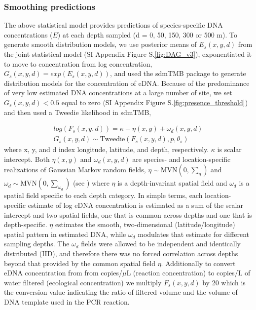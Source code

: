 \documentclass{article}
\begin{document}
\subsubsection*{Smoothing predictions}

The above statistical model provides predictions of species-specific DNA concentrations ($E$) at each depth sampled (d = 0, 50, 150, 300 or 500 m). To generate smooth distribution models, we use posterior means of $E_s(x,y,d)$ from the joint statistical model (SI Appendix Figure S.\ref{fig:DAG_v3}), exponentiated it to move to concentration from log concentration, $G_{s}(x,y,d) = exp(E_{s}(x,y,d))$, and used the sdmTMB package \cite{anderson2022} to generate distribution models for the concentration of eDNA. Because of the predominance of very low estimated DNA concentrations at a large number of site, we set $G_{s}(x,y,d) < 0.5$ equal to zero (SI Appendix Figure S.\ref{fig:presence_threshold}) and then used a Tweedie likelihood in sdmTMB,

\begin{align} 
	 log(F_s(x,y,d)) = \kappa + \eta(x,y) + \omega_{d}(x,y,d) \\
	 G_{s}(x,y,d) \sim \mathrm{Tweedie}(F_s(x,y,d),p ,\theta_s)
\end{align}
where x, y, and d index longitude, latitude, and depth, respectively.   $\kappa$ is scalar intercept. Both $\eta(x,y)$ and $\omega_d(x,y,d)$ are species- and location-specific realizations of Gaussian Markov random fields, $\eta \sim  \mathrm{MVN}(0,\sum_\eta)$ and $\omega_d \sim  \mathrm{MVN}(0,\sum_{\omega_d})$ (see \cite{anderson2022}) where $\eta$ is a depth-invariant spatial field and $\omega_d$ is a spatial field specific to each depth category. In simple terms, each location-specific estimate of log eDNA concentration is estimated as a sum of the scalar intercept and two spatial fields, one that is common across depths and one that is depth-specific. $\eta$ estimates the smooth, two-dimensional (latitude/longitude) spatial pattern in estimated DNA, while $\omega_d$ modulates that estimate for different sampling depths. The $\omega_d$ fields were allowed to be independent and identically distributed (IID), and therefore there was no forced correlation across depths beyond that provided by the common spatial field $\eta$. Additionally to convert eDNA concentration from from copies/$\mu$L (reaction concentration) to copies/L of water filtered (ecological concentration) we multiply $F_s(x,y,d)$ by 20 which is the conversion value indicating the ratio of filtered volume and the volume of DNA template used in the PCR reaction.
\end{document}
